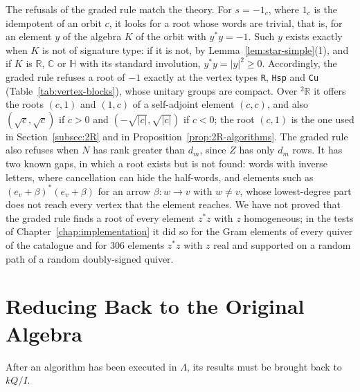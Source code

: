 \documentclass[12pt, a4paper]{report}
\theoremstyle{plain}
\theoremstyle{definition}
\theoremstyle{remark}
\theoremstyle{plain}
\newcommand{\RR}{\mathbb{R}}
\newcommand{\CC}{\mathbb{C}}
\newcommand{\HH}{\mathbb{H}}
\newcommand{\twoR}{{}^{2}\mathbb{R}}
\begin{document}
The refusals of the graded rule match the theory. For $s=-1_c$, where $1_c$ is the idempotent of an orbit $c$, it looks for a root whose words are trivial, that is, for an element $y$ of the algebra $K$ of the orbit with $y^*y=-1$. Such $y$ exists exactly when $K$ is not of signature type: if it is not, by Lemma~\ref{lem:star-simple}(1), and if $K$ is $\RR$, $\CC$ or $\HH$ with its standard involution, $y^*y=|y|^2\geq0$. Accordingly, the graded rule refuses a root of $-1$ exactly at the vertex types \texttt{R}, \texttt{Hsp} and \texttt{Cu} (Table~\ref{tab:vertex-blocks}), whose unitary groups are compact. Over $\twoR$ it offers the roots $(c,1)$ and $(1,c)$ of a self-adjoint element $(c,c)$, and also $(\sqrt c,\sqrt c)$ if $c>0$ and $(-\sqrt{|c|},\sqrt{|c|})$ if $c<0$; the root $(c,1)$ is the one used in Section~\ref{subsec:2R} and in Proposition~\ref{prop:2R-algorithms}. The graded rule also refuses when $N$ has rank greater than $d_m$, since $Z$ has only $d_m$ rows. It has two known gaps, in which a root exists but is not found: words with inverse letters, where cancellation can hide the half-words, and elements such as $(e_v+\beta)^*(e_v+\beta)$ for an arrow $\beta:w\to v$ with $w\neq v$, whose lowest-degree part does not reach every vertex that the element reaches. We have not proved that the graded rule finds a root of every element $z^*z$ with $z$ homogeneous; in the tests of Chapter~\ref{chap:implementation} it did so for the Gram elements of every quiver of the catalogue and for $306$ elements $z^*z$ with $z$ real and supported on a random path of a random doubly-signed quiver.

\section{Reducing Back to the Original Algebra}
\label{sec:reduction}
After an algorithm has been executed in $\Lambda$, its results must be brought back to $kQ/I$.
\end{document}
